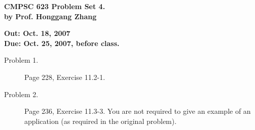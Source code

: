 \documentclass[11pt]{article}
\begin{document}

\begin{center}
{\bf CMPSC 623 Problem Set 4.} \\
{\bf by Prof. Honggang Zhang} \\
\end{center}
\begin{center}
{\bf Out: Oct. 18, 2007} \\
{\bf Due: Oct. 25, 2007, before class.} \\

\end{center}


\begin{description}

\item[Problem 1.] Page 228, Exercise 11.2-1.



\item[Problem 2.] Page 236, Exercise 11.3-3. You are not required
to give an example of an application (as required in the original problem).

\begin{comment}
-------------------------

\item[Problem 2.]

Suppose we use quadratic probing
$$
h(k,i)=(h'(k) + c i^2) \quad \mbox{mod} \quad m.
$$
Show that if the table size $m$ is a prime number, the first $\lfloor m/2
\rfloor$ probes are distinct.

\noindent \textbf{Solution:}

Proof by contradiction. Assume the claim is false, then there exists $i\ne j$
such that $0\le i < j < \lfloor m/2 \rfloor$ and $i$-th and $j$-th probe will
probe the same slot.

Then, we have:
\begin{eqnarray}
h(x, i) = h(x,j) &\Rightarrow& h'(x)+i^2 = h'(x) + j^2 (mod \quad m) \\
&\Rightarrow& i^2 = j^2 (mod \quad m) \\
&\Rightarrow& i^2 - j^2 =0 (mod \quad m) \\
&\Rightarrow& (i - j)(i + j) =0 (mod \quad m)
\end{eqnarray}

As $m$ is a prime number, we must have either $(i - j)=0 (mod \quad m)$ or $(i
+ j) = 0 (mod \quad m)$. However, either case cannot be true, thus, our
assumption is false. Therefore, the claim is correct.
-------------------------------


\end{comment}
\end{description}
\end{document}
